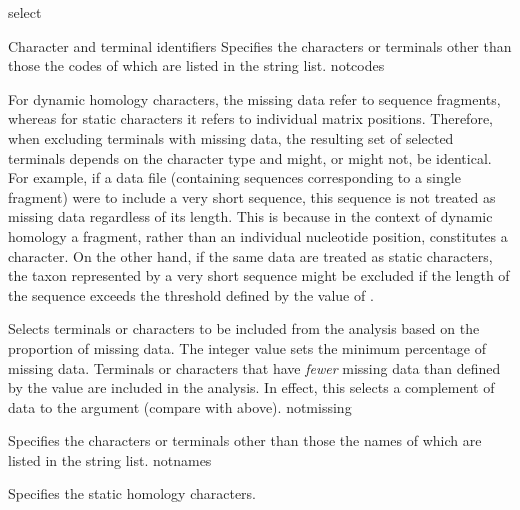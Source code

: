 \begin{command}{select}{}
\begin{arguments}
\begin{argumentgroup}{Character and terminal identifiers}
                {Specifies the characters or terminals other than those the
                codes of which are listed in the string list.}
                {notcodes}
    
     \begin{statement}
                For dynamic homology characters, the missing data refer to
                sequence fragments, whereas for static characters it refers to
                individual matrix positions. Therefore, when excluding
                terminals with missing data, the resulting set of selected
                terminals depends on the character type and might, or
                might not, be identical. For example, if a data file (containing
                sequences corresponding to a single fragment) were to include
                a very short sequence, this sequence is not treated as
                missing data regardless of its length. This is because in the
                context of dynamic homology a fragment, rather than an
                individual nucleotide position, constitutes a character.
                On the other hand, if the same data are treated as static characters,
                the taxon represented by a very short sequence
                might be excluded if the length of the sequence exceeds the
                threshold defined by the value of .
                \end{statement}

                {Selects terminals or characters to be included from the analysis
                based on the proportion of missing data. The
                integer value sets the minimum percentage of missing
                data. Terminals or characters that have  \emph{fewer} missing data
                than defined by the value are included in the analysis.
                In effect, this selects a complement of data to the argument 
                (compare with  above).}
                {notmissing} 
		
                {Specifies the characters or terminals other than those the
                names of which are listed in the string list.}
                {notnames}

           
                {Specifies the static homology characters.}
                {}


\end{argumentgroup}
\end{arguments}
\end{command}
